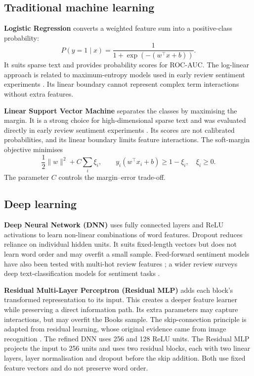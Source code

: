\documentclass[11pt,a4paper]{article}
\begin{document}
\subsection{Traditional machine learning}
\textbf{Logistic Regression} converts a weighted feature sum into a positive-class probability:
\[
P(y=1\mid x)=\frac{1}{1+\exp(-(w^\top x+b))}.
\]
It suits sparse text and provides probability scores for ROC-AUC. The log-linear approach is related to maximum-entropy models used in early review sentiment experiments \cite{pang}. Its linear boundary cannot represent complex term interactions without extra features.

\textbf{Linear Support Vector Machine} separates the classes by maximising the margin. It is a strong choice for high-dimensional sparse text and was evaluated directly in early review sentiment experiments \cite{pang}. Its scores are not calibrated probabilities, and its linear boundary limits feature interactions. The soft-margin objective minimises
\[
\frac{1}{2}\lVert w\rVert^2+C\sum_i \xi_i,
\qquad
y_i(w^\top x_i+b)\geq 1-\xi_i,\quad \xi_i\geq0.
\]
The parameter \(C\) controls the margin--error trade-off.

\subsection{Deep learning}
\textbf{Deep Neural Network (DNN)} uses fully connected layers and ReLU activations to learn non-linear combinations of word features. Dropout reduces reliance on individual hidden units. It suits fixed-length vectors but does not learn word order and may overfit a small sample. Feed-forward sentiment models have also been tested with multi-hot review features \cite{vassilev}; a wider review surveys deep text-classification models for sentiment tasks \cite{minaee}.

\textbf{Residual Multi-Layer Perceptron (Residual MLP)} adds each block's transformed representation to its input. This creates a deeper feature learner while preserving a direct information path. Its extra parameters may capture interactions, but may overfit the Books sample. The skip-connection principle is adapted from residual learning, whose original evidence came from image recognition \cite{he}. The refined DNN uses 256 and 128 ReLU units. The Residual MLP projects the input to 256 units and uses two residual blocks, each with two linear layers, layer normalisation and dropout before the skip addition. Both use fixed feature vectors and do not preserve word order.
\end{document}
